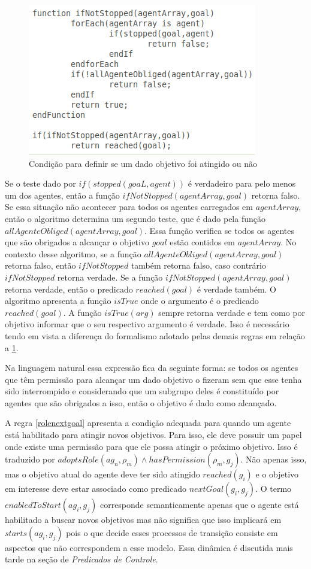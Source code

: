 \begin{figure}[H]
  \centering
  \includegraphics[width=0.6\linewidth]{figure/algrule6.png} 
  \caption{Condição para definir se um dado objetivo foi atingido ou não} \label{wenStop}  
\end{figure}

Se o teste dado por $if(stopped(goaL,agent))$ é verdadeiro para pelo menos um dos agentes, então a função $ifNotStopped(agentArray,goal)$ retorna falso. Se essa situação não acontecer para todos os agentes carregados em $agentArray$, então o algoritmo determina um segundo teste, que é dado pela função $allAgenteObliged(agentArray,goal)$. Essa função verifica se todos os agentes que são obrigados a alcançar o objetivo $goal$ estão contidos em $agentArray$. No contexto desse algoritmo, se a função $allAgenteObliged(agentArray,goal)$ retorna falso, então $ifNotStopped$ também retorna falso, caso contrário $ifNotStopped$ retorna verdade. Se a função $ifNotStopped(agentArray,goal)$ retorna verdade, então o predicado $reached(goal)$ é verdade também. O algoritmo apresenta a função $isTrue$ onde o argumento é o predicado $reached(goal)$. A função $isTrue(arg)$ sempre retorna verdade e tem como por objetivo informar que o seu respectivo argumento é verdade. Isso é necessário tendo em vista a diferença do formalismo adotado pelas demais regras em relação a \ref{wenStop}.

Na linguagem natural essa expressão fica da seguinte forma: se todos os agentes que têm permissão para alcançar um dado objetivo o fizeram sem que esse tenha sido interrompido e considerando que um subgrupo deles é constituído por agentes que são obrigados a isso, então o objetivo é dado como alcançado.

A regra \ref{rolenextgoal} apresenta a condição adequada para quando um agente está habilitado para atingir novos objetivos. Para isso, ele deve possuir um papel onde existe uma permissão para que ele possa atingir o próximo objetivo. Isso é traduzido por $ adoptsRole(ag_n,\rho_m) \wedge hasPermission(\rho_m,g_j) $. Não apenas isso, mas o objetivo atual do agente deve ter sido atingido $ reached(g_i) $ e o objetivo em interesse deve estar associado como predicado $nextGoal(g_i,g_j)$. O termo $enabledToStart(ag_i,g_j)$ corresponde semanticamente apenas que o agente está habilitado a buscar novos objetivos mas não significa que isso implicará em $starts(ag_i,g_j)$ pois o que decide esses processos de transição consiste em aspectos que não correspondem a esse modelo. Essa dinâmica é discutida mais tarde na seção de \textit{Predicados de Controle}.

